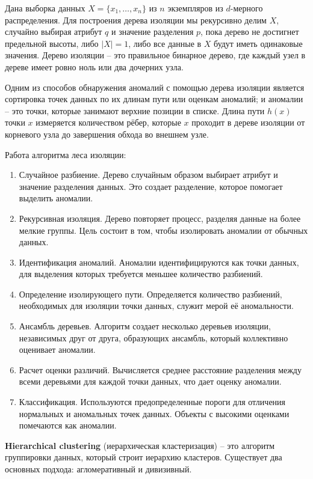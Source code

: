 Дана выборка данных $X = \{x_1, \ldots, x_n\}$ из $n$ экземпляров из $d$-мерного распределения. Для построения дерева изоляции мы рекурсивно делим $X$, случайно выбирая атрибут $q$ и значение разделения $p$, пока дерево не достигнет предельной высоты, либо $|X| = 1$, либо все данные в $X$ будут иметь одинаковые значения. Дерево изоляции -- это правильное бинарное дерево, где каждый узел в дереве имеет ровно ноль или два дочерних узла.

Одним из способов обнаружения аномалий с помощью дерева изоляции является сортировка точек данных по их длинам пути или оценкам аномалий; и аномалии -- это точки, которые занимают верхние позиции в списке. Длина пути $h(x)$ точки $x$ измеряется количеством рёбер, которые $x$ проходит в дереве изоляции от корневого узла до завершения обхода во внешнем узле.

Работа алгоритма леса изоляции:
\vspace{-1.5em}
\begin{enumerate}[itemsep=0pt, topsep=1.5em]
    \item Случайное разбиение. Дерево случайным образом выбирает атрибут и значение разделения данных. Это создает разделение, которое помогает выделить аномалии.
    \item Рекурсивная изоляция. Дерево повторяет процесс, разделяя данные на более мелкие группы. Цель состоит в том, чтобы изолировать аномалии от обычных данных.
    \item Идентификация аномалий. Аномалии идентифицируются как точки данных, для выделения которых требуется меньшее количество разбиений.
    \item Определение изолирующего пути. Определяется количество разбиений, необходимых для изоляции точки данных, служит мерой её аномальности.
    \item Ансамбль деревьев. Алгоритм создает несколько деревьев изоляции, независимых друг от друга, образующих ансамбль, который коллективно оценивает аномалии.
    \item Расчет оценки различий. Вычисляется среднее расстояние разделения между всеми деревьями для каждой точки данных, что дает оценку аномалии.
    \item Классификация. Используются предопределенные пороги для отличения нормальных и аномальных точек данных. Объекты с высокими оценками помечаются как аномалии.
\end{enumerate}
\vspace{-1.5em}

\textbf{Hierarchical clustering} (иерархическая кластеризация) -- это алгоритм группировки данных, который строит иерархию кластеров. Существует два основных подхода: агломеративный и дивизивный.


